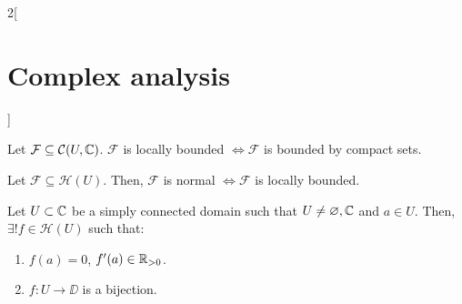 \documentclass[../../../main_math.tex]{subfiles}
\begin{document}
\begin{multicols}{2}[\section{Complex analysis}]
  \begin{lemma}
    Let $\mathcal{F}\subseteq \mathcal{C}(U,\mathbb{C})$. $\mathcal{F}$ is locally bounded $\iff \mathcal{F}$ is bounded by compact sets.
  \end{lemma}
  \begin{theorem}
    Let $\mathcal{F}\subseteq \mathcal{H}(U)$. Then, $\mathcal{F}$ is normal $\iff \mathcal{F}$ is locally bounded.
  \end{theorem}
  \begin{theorem}
    Let $U\subset \mathbb{C}$ be a simply connected domain such that $U\ne\varnothing,\mathbb{C}$ and $a\in U$. Then, $\exists!f\in\mathcal{H}(U)$ such that:
    \begin{enumerate}
      \item $f(a)=0$, $f'(a)\in\mathbb{R}_{>0}$.
      \item $f:U\rightarrow \DD$ is a bijection.
    \end{enumerate}
  \end{theorem}
\end{multicols}
\end{document}
